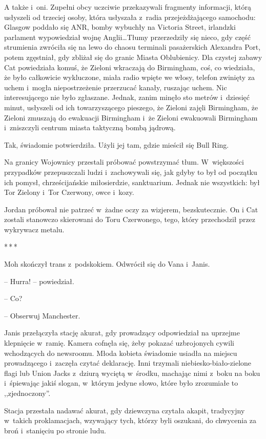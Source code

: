 \documentclass[oneside,polish,11pt,sfheadings]{mwbk}
\newcommand{\threeast}{\bigskip\par\centerline{*\,*\,*}\medskip\par}%
\begin{document}
A także i~oni. Zupełni obcy uczciwie przekazywali fragmenty informacji,
którą usłyszeli od trzeciej osoby, która usłyszała z~radia
przejeżdżającego samochodu: Glasgow poddało się ANR, bomby wybuchły na
Victoria Street, irlandzki parlament wypowiedział wojnę Anglii\ldots Tłumy
przerzedziły się nieco, gdy część strumienia zwróciła się na lewo do
chaosu terminali pasażerskich Alexandra Port, potem zgęstniał, gdy
zbliżał się do granic Miasta Oblubienicy. Dla czystej zabawy Cat
powiedziała komuś, że Zieloni wkraczają do Birmingham, coś, co
wiedziała, że było całkowicie wykluczone, miała radio wpięte we włosy,
telefon zwinięty za uchem i~mogła niepostrzeżenie przerzucać kanały,
ruszając uchem. Nic interesującego nie było zgłaszane. Jednak, zanim
minęło sto metrów i~dziesięć minut, usłyszeli od ich towarzyszącego
pieszego, że Zieloni zajęli Birmingham, że Zieloni zmuszają do ewakuacji
Birmingham i~że Zieloni ewakuowali Birmingham i~zniszczyli centrum
miasta taktyczną bombą jądrową.

Tak, świadomie potwierdziła. Użyli jej tam, gdzie mieścił się Bull Ring.

Na granicy Wojownicy przestali próbować powstrzymać tłum. W~większości
przypadków przepuszczali ludzi i~zachowywali się, jak gdyby to był od
początku ich pomysł, chrześcijańskie miłosierdzie, sanktuarium. Jednak
nie wszystkich: był Tor Zielony i~Tor Czerwony, owce i~kozy.

Jordan próbował nie patrzeć w~żadne oczy za wizjerem, bezskutecznie. On
i Cat zostali stanowczo skierowani do Toru Czerwonego, tego, który
przechodził przez wykrywacz metalu.
  \threeast 

Moh skończył trans z~podskokiem. Odwrócił się do Vana i~Janis.

-- Hurra! -- powiedział.

-- Co?

-- Obserwuj Manchester.

Janis przełączyła stację akurat, gdy prowadzący odpowiedział na uprzejme
klepnięcie w~ramię. Kamera cofnęła się, żeby pokazać uzbrojonych cywili
wchodzących do newsroomu. Młoda kobieta świadomie usiadła na miejscu
prowadzącego i~zaczęła czytać deklarację. Inni trzymali
niebiesko-biało-zielone flagi lub Union Jacks z~dziurą wyciętą w~środku,
machając nimi z~boku na boku i~śpiewając jakiś slogan, w~którym jedyne
słowo, które było zrozumiałe to ,,zjednoczony''.

Stacja przestała nadawać akurat, gdy dziewczyna czytała akapit,
tradycyjny w~takich proklamacjach, wzywający tych, którzy byli oszukani,
do chwycenia za broń i~stanięciu po stronie ludu.
\end{document}

